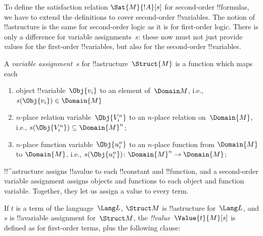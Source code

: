 \documentclass[../../../include/open-logic-section]{subfiles}
\begin{document}


\begin{explain}
To define the satisfaction relation $\Sat{M}{!A}[s]$ for second-order
!!{formula}s, we have to extend the definitions to cover second-order
!!{variable}s.  The notion of !!a{structure} is the same for second-order
logic as it is for first-order logic. There is only a difference for
variable assignments~$s$: these now must not just provide values for
the first-order !!{variable}s, but also for the second-order !!{variable}s.
\end{explain}

\begin{defn}
A \emph{variable assignment}~$s$ for !!a{structure}~$\Struct{M}$ is a
function which maps each
\begin{enumerate}
\item object !!{variable}~$\Obj{v_i}$ to an element of~$\Domain M$,
  i.e., $s(\Obj{v_i}) \in \Domain{M}$
\item $n$-place relation variable~$\Obj{V_i^n}$ to an $n$-place
  relation on~$\Domain{M}$, i.e., $s(\Obj{V_i^n}) \subseteq \Domain{M}^n$;
\item $n$-place function variable~$\Obj{u_i^n}$ to an $n$-place
  function from $\Domain{M}$ to $\Domain{M}$, i.e.,
  $s(\Obj{u_i^n})\colon \Domain{M}^n \to \Domain{M}$;
\end{enumerate}
\end{defn}

\begin{explain}
!!^a{structure} assigns !!a{value} to each !!{constant} and
!!{function}, and a second-order variable assignment assigns objects and
functions to each object and function variable. Together, they let us
assign a value to every term.
\end{explain}

\begin{defn}
If $t$ is a term of the language~$\Lang L$, $\Struct M$ is
!!a{structure} for~$\Lang L$, and $s$ is !!a{variable} assignment
for~$\Struct M$, the \emph{!!{value}}~$\Value{t}{M}[s]$ is defined as
for first-order terms, plus the following clause:
\begin{quote}
\end{quote}
\end{defn}
\end{document}
